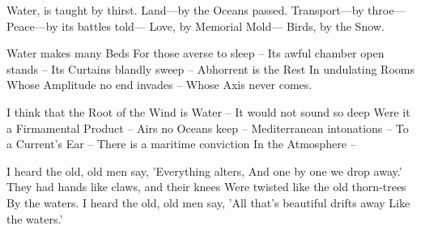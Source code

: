 \documentclass[12pt, letterpaper]{report}
\begin{document}
\clearpage

\author{Emily Dickinson}

\begin{poem}
\begin{stanza}
Water, is taught by thirst.\verseline
Land---by the Oceans passed.\verseline
Transport---by throe---\verseline
Peace---by its battles told---\verseline
Love, by Memorial Mold---\verseline
Birds, by the Snow.
\end{stanza}
\end{poem}

\author{Emily Dickinson}

\begin{poem}
\begin{stanza}
Water makes many Beds\verseline
For those averse to sleep --\verseline
Its awful chamber open stands --\verseline
Its Curtains blandly sweep --\verseline
Abhorrent is the Rest\verseline
In undulating Rooms\verseline
Whose Amplitude no end invades --\verseline
Whose Axis never comes.
\end{stanza}
\end{poem}

\author{by Emily Dickinson}

\begin{poem}
\begin{stanza}
I think that the Root of the Wind is Water --\verseline
It would not sound so deep\verseline
Were it a Firmamental Product --\verseline
Airs no Oceans keep --\verseline
Mediterranean intonations --\verseline
To a Current's Ear --\verseline
There is a maritime conviction\verseline
In the Atmosphere --
\end{stanza}
\end{poem}

\clearpage

\author{William Butler Yeats}

\begin{poem}
\begin{stanza}
I heard the old, old men say,\verseline
'Everything alters,\verseline
And one by one we drop away.'\verseline
They had hands like claws, and their knees\verseline
Were twisted like the old thorn-trees\verseline
By the waters.\verseline
I heard the old, old men say,\verseline
'All that's beautiful drifts away\verseline
Like the waters.'
\end{stanza}
\end{poem}
\end{document}
